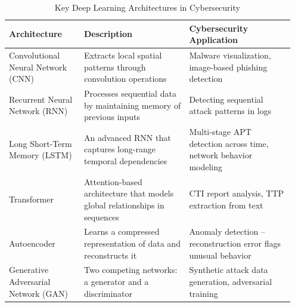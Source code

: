 \begin{table}[H]
\centering
\begin{tabular}{|p{0.25\linewidth}|p{0.35\linewidth}|p{0.35\linewidth}|}
\hline
\textbf{Architecture} & \textbf{Description} & \textbf{Cybersecurity Application} \\ \hline
Convolutional Neural Network (CNN) & Extracts local spatial patterns through convolution operations & Malware visualization, image-based phishing detection \\ \hline
Recurrent Neural Network (RNN) & Processes sequential data by maintaining memory of previous inputs & Detecting sequential attack patterns in logs \\ \hline
Long Short-Term Memory (LSTM) & An advanced RNN that captures long-range temporal dependencies~\cite{hochreiter1997lstm} & Multi-stage APT detection across time, network behavior modeling \\ \hline
Transformer & Attention-based architecture that models global relationships in sequences & CTI report analysis, TTP extraction from text \\ \hline
Autoencoder & Learns a compressed representation of data and reconstructs it & Anomaly detection -- reconstruction error flags unusual behavior \\ \hline
Generative Adversarial Network (GAN) & Two competing networks: a generator and a discriminator & Synthetic attack data generation, adversarial training \\ \hline
\end{tabular}
\caption{Key Deep Learning Architectures in Cybersecurity}
\label{tab:dl_architectures}
\end{table}


